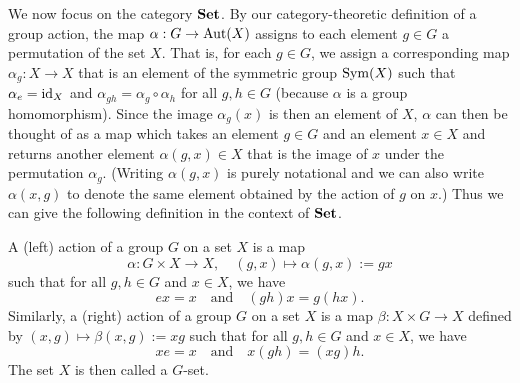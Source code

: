 We now focus on the category \(\mathbf{Set}\). By our category-theoretic definition of a
group action, the map \(\alpha: G \to \operatorname{Aut}(X)\) assigns to each element \(g \in
G\) a permutation of the set \(X\). That is, for each \(g \in G\), we assign a
corresponding map \(\alpha_g : X \to X\) that is an element of the symmetric
group \(\operatorname{Sym}(X)\) such that \(\alpha_e = \operatorname{id}_X\) and \(\alpha_{gh} = \alpha_g
\circ \alpha_h\) for all \(g, h \in G\) (because \(\alpha\) is a group
homomorphism). Since the image \(\alpha_g(x)\) is then an element of \(X\),
\(\alpha\) can then be thought of as a map which takes an element \(g \in G\)
and an element \(x \in X\) and returns another element \(\alpha(g, x) \in X\)
that is the image of \(x\) under the permutation \(\alpha_g\). (Writing
\(\alpha(g, x)\) is purely notational and we can also write \(\alpha(x, g)\) to
denote the same element obtained by the action of \(g\) on \(x\).) Thus we can
give the following definition in the context of \(\mathbf{Set}\).

\begin{definition}
    A (left) action of a group \(G\) on a set \(X\) is a map
    \[
        \alpha: G \times X \to X, \quad (g, x) \mapsto \alpha(g, x) := gx
    \]
    such that for all \(g, h \in G\) and \(x \in X\), we have
    \[
        e x = x \quad \text{and} \quad (gh)x = g(hx).
    \]
    Similarly, a (right) action of a group \(G\) on a set \(X\) is a map
    \(\beta: X \times G \to X\) defined by \((x, g) \mapsto \beta(x, g) := xg\)
    such that for all \(g, h \in G\) and \(x \in X\), we have
    \[
        x e = x \quad \text{and} \quad x(gh) = (xg)h.
    \]
    The set \(X\) is then called a \(G\)-set.
\end{definition}

